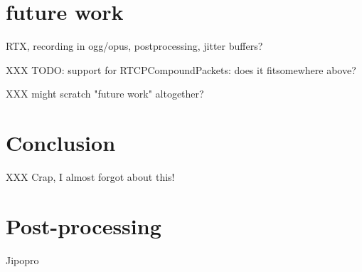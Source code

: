 \documentclass[twoside,openright,a4paper,11pt,english]{article}
\begin{document}
\section{future work}
RTX, recording in ogg/opus, postprocessing, jitter buffers?


XXX TODO: support for RTCPCompoundPackets: does it fitsomewhere above?

XXX might scratch "future work" altogether?

\section{Conclusion}
XXX Crap, I almost forgot about this!

\appendix
\section{Post-processing}
Jipopro
\end{document}
